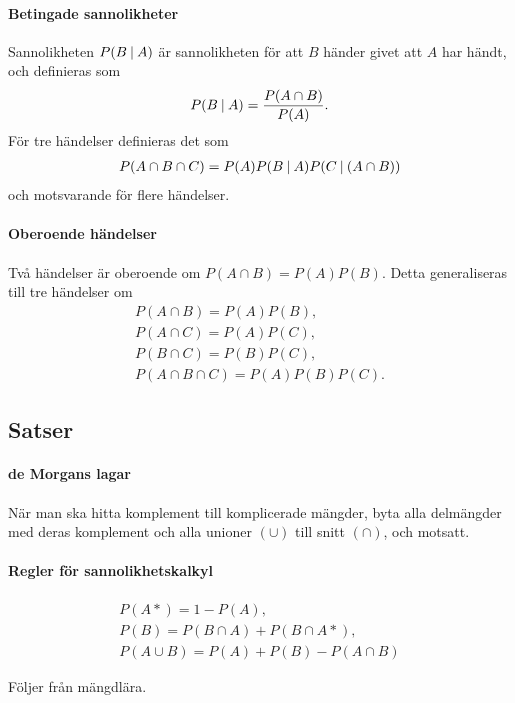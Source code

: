 \paragraph{Betingade sannolikheter}
Sannolikheten $P(B\:\vert\: A)$ är sannolikheten för att $B$ händer givet att $A$ har händt, och definieras som
\begin{align*}
	P(B\:\vert\: A) = \frac{P(A\cap B)}{P(A)}.
\end{align*}
För tre händelser definieras det som
\begin{align*}
	P(A\cap B\cap C) = P(A)P(B\:\vert\: A)P(C\:\vert\: (A\cap B))
\end{align*}
och motsvarande för flere händelser.

\paragraph{Oberoende händelser}
Två händelser är oberoende om $P(A\cap B) = P(A)P(B)$. Detta generaliseras till tre händelser om
\begin{align*}
	P(A\cap B) = P(A)P(B), \\
	P(A\cap C) = P(A)P(C), \\
	P(B\cap C) = P(B)P(C), \\
	P(A\cap B\cap C) = P(A)P(B)P(C).
\end{align*}

\subsection{Satser}

\paragraph{de Morgans lagar}
När man ska hitta komplement till komplicerade mängder, byta alla delmängder med deras komplement och alla unioner $(\cup)$ till snitt $(\cap)$, och motsatt.

\paragraph{Regler för sannolikhetskalkyl}
\begin{align*}
	P(A*) = 1 - P(A), \\
	P(B) = P(B\cap A) + P(B\cap A*), \\
	P(A\cup B) = P(A) + P(B) - P(A\cap B)
\end{align*}

\proof
Följer från mängdlära.

